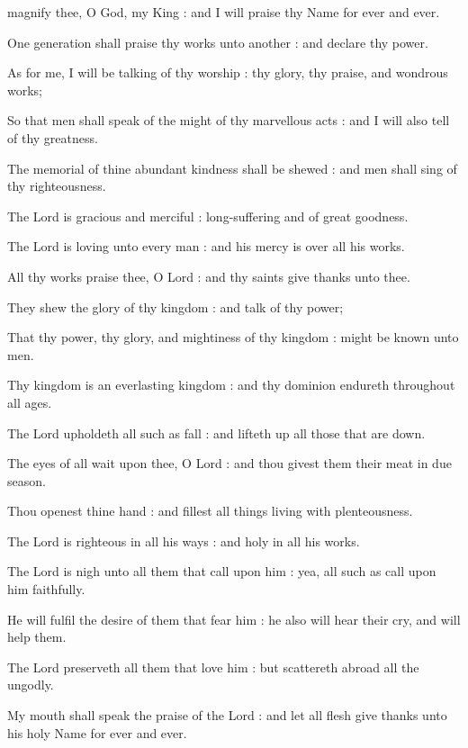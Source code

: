  magnify thee, O God, my King : and I will praise thy Name for ever and ever.\par
{}
One generation shall praise thy works unto another : and declare thy power.\par
{}As for me, I will be talking of thy worship : thy glory, thy praise, and wondrous works;\par
{}So that men shall speak of the might of thy marvellous acts : and I will also tell of thy greatness.\par
{}The memorial of thine abundant kindness shall be shewed : and men shall sing of thy righteousness.\par
{}The Lord is gracious and merciful : long-suffering and of great goodness.\par
{}The Lord is loving unto every man : and his mercy is over all his works.\par
{}All thy works praise thee, O Lord : and thy saints give thanks unto thee.\par
{}They shew the glory of thy kingdom : and talk of thy power;\par
{}That thy power, thy glory, and mightiness of thy kingdom : might be known unto men.\par
{}Thy kingdom is an everlasting kingdom : and thy dominion endureth throughout all ages.\par
{}The Lord upholdeth all such as fall : and lifteth up all those that are down.\par
{}The eyes of all wait upon thee, O Lord : and thou givest them their meat in due season.\par
{}Thou openest thine hand : and fillest all things living with plenteousness.\par
{}The Lord is righteous in all his ways : and holy in all his works.\par
{}The Lord is nigh unto all them that call upon him : yea, all such as call upon him faithfully.\par
{}He will fulfil the desire of them that fear him : he also will hear their cry, and will help them.\par
{}The Lord preserveth all them that love him : but scattereth abroad all the ungodly.\par
{}My mouth shall speak the praise of the Lord : and let all flesh give thanks unto his holy Name for ever and ever.\par

